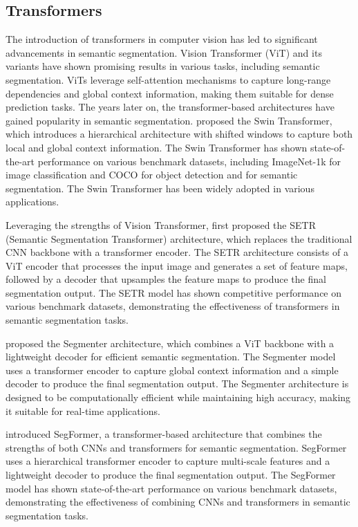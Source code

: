 \subsection{Transformers}
\label{subsec:transformers}
The introduction of transformers in computer vision has led to significant advancements in semantic segmentation. Vision Transformer (ViT) \cite{transformer_vit} and its variants have shown promising results in various tasks, including semantic segmentation. ViTs leverage self-attention mechanisms to capture long-range dependencies and global context information, making them suitable for dense prediction tasks.
The years later on, the transformer-based architectures have gained popularity in semantic segmentation. \cite{transformer_swin} proposed the Swin Transformer, which introduces a hierarchical architecture with shifted windows to capture both local and global context information. The Swin Transformer has shown state-of-the-art performance on various benchmark datasets, including ImageNet-1k \cite{dataset_imagenet} for image classification and COCO \cite{dataset_coco} for object detection and \cite{dataset_ade20k} for semantic segmentation. The Swin Transformer has been widely adopted in various applications.

Leveraging the strengths of Vision Transformer, \cite{fsss_setr} first proposed the SETR (Semantic Segmentation Transformer) architecture, which replaces the traditional CNN backbone with a transformer encoder. The SETR architecture consists of a ViT encoder that processes the input image and generates a set of feature maps, followed by a decoder that upsamples the feature maps to produce the final segmentation output. The SETR model has shown competitive performance on various benchmark datasets, demonstrating the effectiveness of transformers in semantic segmentation tasks.

\cite{fsss_segmenter} proposed the Segmenter architecture, which combines a ViT backbone with a lightweight decoder for efficient semantic segmentation. The Segmenter model uses a transformer encoder to capture global context information and a simple decoder to produce the final segmentation output. The Segmenter architecture is designed to be computationally efficient while maintaining high accuracy, making it suitable for real-time applications.

\cite{fsss_segformer} introduced SegFormer, a transformer-based architecture that combines the strengths of both CNNs and transformers for semantic segmentation. SegFormer uses a hierarchical transformer encoder to capture multi-scale features and a lightweight decoder to produce the final segmentation output. The SegFormer model has shown state-of-the-art performance on various benchmark datasets, demonstrating the effectiveness of combining CNNs and transformers in semantic segmentation tasks.

